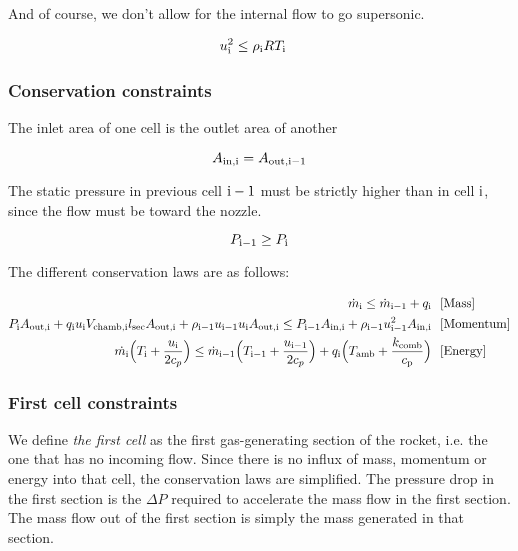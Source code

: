 And of course, we don't allow for the internal flow to go supersonic.

\begin{align}
    u_{\rm{i}}^2 &\leq \rho_{\rm{i}} R T_{\rm{i}}
\end{align}

\subsubsection{Conservation constraints}

The inlet area of one cell is the outlet area of another

\begin{equation}
    A_{\rm{in}, \rm{i}} = A_{\rm{out}, \rm{i}-1}
\end{equation}

The static pressure in previous cell $\rm{i}-1$ must be strictly higher
than in cell $\rm{i}$, since the flow must be toward the nozzle.

\begin{equation}
    P_{\rm{i}-1} \geq P_{\rm{i}}
\end{equation}

The different conservation laws are as follows:

\begin{align}
    \dot{m}_{\rm{i}}
    \leq
    \dot{m}_{\rm{i}-1} + q_{\rm{i}} ~~&\rm{[Mass]}\\
    P_{\rm{i}} A_{\rm{out}, \rm{i}} + q_{\rm{i}} u_{\rm{i}} V_{\rm{chamb},\rm{i}} l_{\rm{sec}} A_{\rm{out},\rm{i}}
    + \rho_{\rm{i}-1} u_{\rm{i}-1} u_{\rm{i}} A_{\rm{out}, \rm{i}}
    \leq
    P_{\rm{i}-1} A_{\rm{in}, \rm{i}} + \rho_{\rm{i}-1} u_{\rm{i}-1}^2 A_{\rm{in},\rm{i}} ~~&[\mathrm{Momentum}]\\
    \dot{m_{\rm{i}}} \Big(T_{\rm{i}} + \frac{u_{\rm{i}}}{2c_p}\Big)
    \leq
    \dot{m}_{\rm{i}-1} \Big(T_{\rm{i}-1} + \frac{u_{\rm{i}-1}}{2c_p}\Big) +
    q_{\rm{i}}\Big(T_{\rm{amb}} + \frac{k_{\rm{comb}}}{c_{\rm{p}}}\Big) ~~&\rm{[Energy]}\\
\end{align}

\subsubsection{First cell constraints}

We define \textit{the first cell} as the first gas-generating section
of the rocket, i.e. the one that has no incoming flow.
Since there is no influx of mass, momentum or energy into that cell,
the conservation laws are simplified.
The pressure drop in the first section is the $\Delta P$ required
to accelerate the mass flow in the first section. The mass flow out of
the first section is simply the mass generated in that section.

